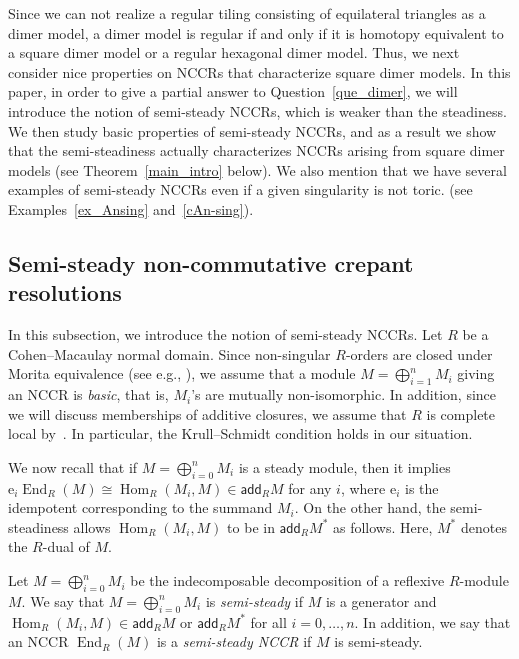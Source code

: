 \documentclass[ALCO,ThmDefs,Unicode]{cedram}
\newcommand{\rme}{\mathrm{e}}
\DeclareMathOperator{\Hom}{Hom}
\DeclareMathOperator{\End}{End}
\newcommand{\add}{\mathsf{add}}
\begin{document}
Since we can not realize a regular tiling consisting of equilateral triangles as a dimer model, a dimer model is regular if and only if it is homotopy equivalent to a square dimer model or a regular hexagonal dimer model. Thus, we next consider nice properties on NCCRs that characterize square dimer models. In this paper, in order to give a partial answer to Question~\ref{que_dimer}, we will introduce the notion of semi-steady NCCRs, which is weaker than the steadiness. We then study basic properties of semi-steady NCCRs, and as a result we show that the semi-steadiness actually characterizes NCCRs arising from square dimer models (see Theorem~\ref{main_intro} below). We also mention that we have several examples of semi-steady NCCRs even if a given singularity is not toric. (see Examples~\ref{ex_Ansing} and~\ref{cAn-sing}).

\subsection{Semi-steady non-commutative crepant resolutions}\label{subsec_intro}

In this subsection, we introduce the notion of semi-steady NCCRs. Let $R$ be a Cohen--Macaulay normal domain. Since non-singular $R$-orders are closed under Morita equivalence (see e.g., \cite[Lemma~2.13]{IW2}), we assume that a module $M=\bigoplus^n_{i=1}M_i$ giving an NCCR is \emph{basic}, that is, $M_i$'s are mutually non-isomorphic. In addition, since we will discuss memberships of additive closures, we assume that $R$ is complete local by~\cite[Proposition~2.26]{IW2}. In particular, the Krull--Schmidt condition holds in our situation.

We now recall that if $M=\bigoplus_{i=0}^nM_i$ is a steady module, then it implies $\rme_i\End_R(M)\cong\Hom_R(M_i,M)\in\add_RM$ for any $i$, where $\rme_i$ is the idempotent corresponding to the summand $M_i$. On the other hand, the semi-steadiness allows $\Hom_R(M_i,M)$ to be in $\add_RM^*$ as follows. Here, $M^*$ denotes the $R$-dual of $M$.

\begin{defi}\label{def_semisteady}
Let $M=\bigoplus_{i=0}^nM_i$ be the indecomposable decomposition of a reflexive $R$-module $M$. We say that $M=\bigoplus_{i=0}^nM_i$ is \emph{semi-steady} if $M$ is a generator and $\Hom_R(M_i,M)\in\add_RM$ or $\add_RM^*$ for all $i=0,\dots,n$. In addition, we say that an NCCR $\End_R(M)$ is a \emph{semi-steady NCCR} if $M$ is semi-steady.
\end{defi}
\end{document}
